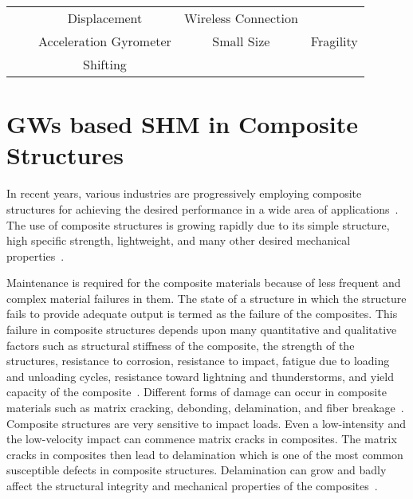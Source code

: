 \documentclass[b5paper, 11pt, titlepage]{book}
\begin{document}
\begin{table}[h]
\begin{adjustbox}{width=\textwidth = {!},center}
\begin{tabular}{ccccc}
			\multicolumn{1}{l}{}                                                                                                 &                              & Displacement                               & Wireless Connection                                                                  & \multicolumn{1}{l}{}                                              \\ \cline{3-5} 
			\multicolumn{1}{l}{}                                                                                                 &                              & \multicolumn{1}{l}{Acceleration Gyrometer} & Small Size                                                                           & Fragility                                                         \\ \cline{3-5} 
			\multicolumn{1}{l}{}                                                                                                 &                              & Shifting                                   & \multicolumn{1}{l}{}                                                                 & \multicolumn{1}{l}{}                                              \\ \hline
		\end{tabular}
	\end{adjustbox}
\end{table}


\section{GWs based SHM in Composite Structures}
In recent years, various industries are progressively employing composite structures for achieving the desired performance in a wide area of applications~\cite{Hameed2019b}. The use of composite structures is growing rapidly due to its simple structure, high specific strength, lightweight, and many other desired mechanical properties~\cite{Radzienski2019}. 

Maintenance is required for the composite materials because of less frequent and complex material failures in them. 
The state of a structure in which the structure fails to provide adequate output is termed as the failure of the composites. This failure in composite structures depends upon many quantitative and qualitative factors such as structural stiffness of the composite, the strength of the structures, resistance to corrosion, resistance to impact, fatigue due to loading and unloading cycles, resistance toward lightning and thunderstorms, and yield capacity of the composite~\cite{Rahul2018}. Different forms of damage can occur in composite materials such as matrix cracking, debonding, delamination, and fiber breakage~\cite{Yu2019,Fakih2019}. Composite structures are very sensitive to impact loads. Even a low-intensity and the low-velocity impact can commence matrix cracks in composites. The matrix cracks in composites then lead to delamination which is one of the most common susceptible defects in composite structures. Delamination can grow and badly affect the structural integrity and mechanical properties of the composites~\cite{Munian2018}. 
\end{document}
